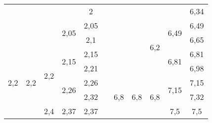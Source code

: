 \begin{table}[H]
\begin{tabular}{|c|c|c|c|c|c|c|c|c|c|c|}
                                    &                      &                      &                       & 2                  &         &                                    &                       &                      &                       & 6,34               \\ \cline{4-5} \cline{9-11} 
                                    &                      &                      & \multirow{2}{*}{2,05} & 2,05               &         &                                    &                       & \multirow{4}{*}{6,2} & \multirow{2}{*}{6,49} & 6,49               \\ \cline{5-5} \cline{11-11} 
                                    &                      &                      &                       & 2,1                &         &                                    &                       &                      &                       & 6,65               \\ \cline{1-5} \cline{10-11} 
\multirow{16}{*}{2,2}               & \multirow{8}{*}{2,2} & \multirow{4}{*}{2,2} & \multirow{2}{*}{2,15} & 2,15               &         &                                    &                       &                      & \multirow{2}{*}{6,81} & 6,81               \\ \cline{5-5} \cline{11-11} 
                                    &                      &                      &                       & 2,21               &         &                                    &                       &                      &                       & 6,98               \\ \cline{4-5} \cline{7-11} 
                                    &                      &                      & \multirow{2}{*}{2,26} & 2,26               &         & \multirow{14}{*}{6,8}              & \multirow{8}{*}{6,8}  & \multirow{4}{*}{6,8} & \multirow{2}{*}{7,15} & 7,15               \\ \cline{5-5} \cline{11-11} 
                                    &                      &                      &                       & 2,32               &         &                                    &                       &                      &                       & 7,32               \\ \cline{3-5} \cline{10-11} 
                                    &                      & \multirow{4}{*}{2,4} & \multirow{2}{*}{2,37} & 2,37               &         &                                    &                       &                      & \multirow{2}{*}{7,5}  & 7,5                \\ \cline{5-5} \cline{11-11} 

\end{tabular}
\end{table}

